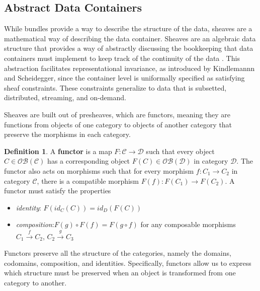 \documentclass[10pt,journal,compsoc]{IEEEtran}
\theoremstyle{definition}
\newtheorem{definition}{Definition}[section]
\theoremstyle{remark}
\begin{document}
\subsection{Abstract Data Containers}
\label{sec:atct:sheaves}
While bundles provide a way to describe the structure of the data, sheaves are a mathematical way of describing the data container. Sheaves are an algebraic data structure that provides a way of abstractly discussing the bookkeeping that data containers must implement to keep track of the continuity of the data \cite{ghristElementaryAppliedTopology2014}. This abstraction facilitates representational invariance, as introduced by Kindlemannn and Scheidegger\cite{kindlmannAlgebraicProcessVisualization2014}, since the container level is uniformally specified as satisfying sheaf constraints. These constraints generalize to data that is subsetted, distributed, streaming, and on-demand. 

Sheaves are built out of presheaves, which are functors, meaning they are functions from objects of one category to objects of another category\cite{bradleyWhatFunctorDefinitions} that preserve the morphisms in each category. 
\begin{definition} A \textbf{functor} is a map $F: \mathcal{C} \rightarrow \mathcal{D}$ such that every object $C \in \mathcal{OB(C)}$ has a corresponding object $F(C) \in \mathcal{OB(D)}$ in category $\mathcal{D}$. The functor also acts on morphisms such that for every morphism $f: C_1 \rightarrow C_2$ in category $\mathcal{C}$, there is a compatible morphism $F(f): F(C_{1}) \rightarrow F(C_2)$. 
A functor must satisfy the properties 
\begin{itemize}
  \item \textit{identity}: $F(id_{C}(C)) = id_{D}(F(C))$
  \item \textit{composition}:$F(g)\circ F(f) = F(g\circ f)$ for any composable morphisms $C_{1}\xrightarrow{f} C_2$, $C_2 \xrightarrow{g} C_3$
\end{itemize}
\end{definition}
Functors preserve all the structure of the categories, namely the domains, codomains, composition, and identities\cite{riehlCategoryTheoryContext}. Specifically, functors allow us to express which structure must be preserved when an object is transformed from one category to another. 
\end{document}
